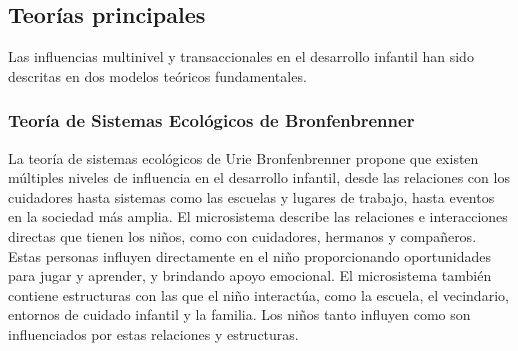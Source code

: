 \documentclass[11pt,letterpaper]{report}
\begin{document}
\subsection{Teorías principales}
Las influencias multinivel y transaccionales en el desarrollo infantil han sido
descritas en dos modelos teóricos fundamentales.

\subsubsection{Teoría de Sistemas Ecológicos de Bronfenbrenner}
La teoría de sistemas ecológicos de Urie Bronfenbrenner propone que existen
múltiples niveles de influencia en el desarrollo infantil, desde las relaciones
con los cuidadores hasta sistemas como las escuelas y lugares de trabajo, hasta
eventos en la sociedad más amplia. El microsistema describe las relaciones e
interacciones directas que tienen los niños, como con cuidadores, hermanos y
compañeros. Estas personas influyen directamente en el niño proporcionando
oportunidades para jugar y aprender, y brindando apoyo emocional. El
microsistema también contiene estructuras con las que el niño interactúa, como
la escuela, el vecindario, entornos de cuidado infantil y la familia. Los niños
tanto influyen como son influenciados por estas relaciones y estructuras.
\cite{Feldman3}
\end{document}
